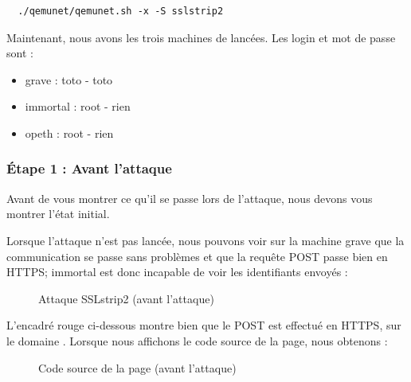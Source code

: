 \begin{verbatim}
  ./qemunet/qemunet.sh -x -S sslstrip2
\end{verbatim}

Maintenant, nous avons les trois machines de lancées. Les login et mot de passe sont :

\begin{itemize}
\item grave : toto - toto
\item immortal : root - rien
\item opeth : root - rien
\end{itemize}

\subsubsection{Étape 1 : Avant l'attaque}

Avant de vous montrer ce qu'il se passe lors de l'attaque, nous devons vous montrer l'état initial.

Lorsque l'attaque n'est pas lancée, nous pouvons voir sur la machine grave que la communication se passe sans problèmes et que la requête POST passe bien en HTTPS; immortal est donc incapable de voir les identifiants envoyés :

\begin{figure}[H]
  \caption{Attaque SSLstrip2 (avant l'attaque)}
\end{figure}

L'encadré rouge ci-dessous montre bien que le POST est effectué en HTTPS, sur le domaine . Lorsque nous affichons le code source de la page, nous obtenons :

\begin{figure}[H]
  \caption{Code source de la page (avant l'attaque)}
\end{figure}

